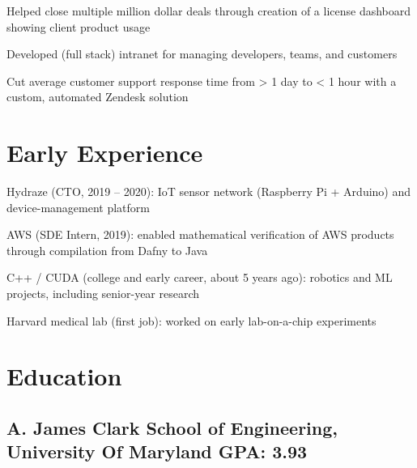 \documentclass[print]{jack-resume}
\begin{document}
\begin{tightemize}
    \item Helped close multiple million dollar deals through creation of a license dashboard showing client product usage
    \item Developed (full stack) intranet for managing developers, teams, and customers
    \item Cut average customer support response time from > 1 day to < 1 hour with a custom, automated Zendesk solution
\end{tightemize}
\sectionsep

\section{Early Experience}
\vspace{1.4em}
\begin{tightemize}
    \item Hydraze (CTO, 2019 -- 2020): IoT sensor network (Raspberry Pi + Arduino) and device-management platform
    \item AWS (SDE Intern, 2019): enabled mathematical verification of AWS products through compilation from Dafny to Java
    \item C++ / CUDA (college and early career, about 5 years ago): robotics and ML projects, including senior-year research
    \item Harvard medical lab (first job): worked on early lab-on-a-chip experiments
\end{tightemize}
\sectionsep

\section{Education}
\subsection{A. James Clark School of Engineering, University Of Maryland \hfill GPA: 3.93}

\begin{minipage}[t]{0.04\textwidth}
    \hfill
\end{minipage}
\end{document}
